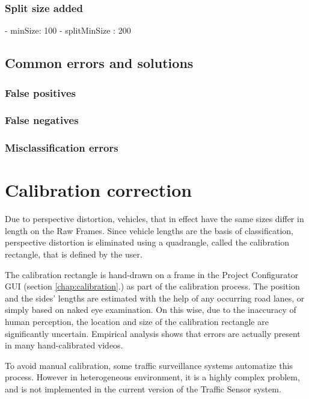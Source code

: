 \subsubsection{Split size added}
- minSize: 100
- splitMinSize : 200

\subsection{Common errors and solutions}
\subsubsection{False positives}
\subsubsection{False negatives}
\subsubsection{Misclassification errors}

\section{Calibration correction}\label{chap:cal_corr}
Due to perspective distortion, vehicles, that in effect have the same sizes differ in length on the Raw Frames.
Since vehicle lengths are the basis of classification, perspective distortion is eliminated using a quadrangle, called the calibration rectangle, that is defined by the user.

The calibration rectangle is hand-drawn on a frame in the Project Configurator GUI (section \ref{chap:calibration}.) as part of the calibration process.
The position and the sides' lengths are estimated with the help of any occurring road lanes, or simply based on naked eye examination.
On this wise, due to the inaccuracy of human perception, the location and size of the calibration rectangle are significantly uncertain.
Empirical analysis shows that errors are actually present in many hand-calibrated videos.

To avoid manual calibration, some traffic surveillance systems automatize this process.
However in heterogeneous environment, it is a highly complex problem, and is not implemented in the current version of the Traffic Sensor system.

